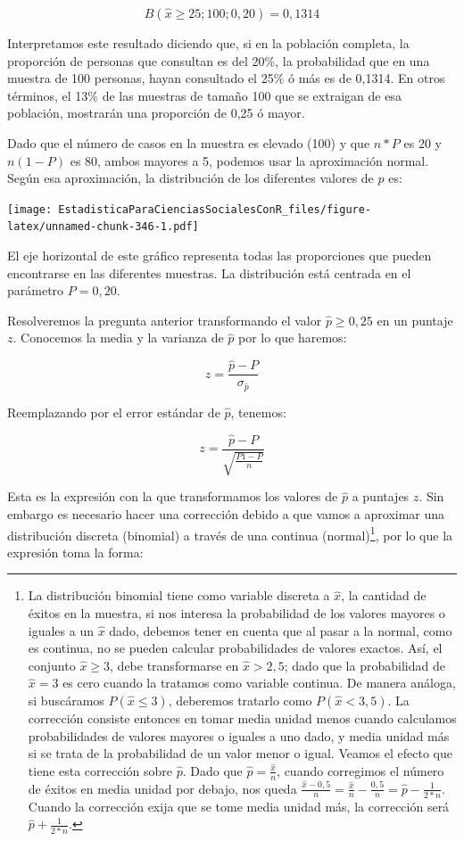 \documentclass[]{book}
\let\rmarkdownfootnote\footnote%
\def\footnote{\protect\rmarkdownfootnote}
\begin{document}
\[B( \widehat{x} \geq 25;100;0,20) = 0,1314\]

Interpretamos este resultado diciendo que, si en la población completa,
la proporción de personas que consultan es del 20\%, la probabilidad que
en una muestra de 100 personas, hayan consultado el 25\% ó más es de
0,1314. En otros términos, el 13\% de las muestras de tamaño 100 que se
extraigan de esa población, mostrarán una proporción de 0,25 ó mayor.

Dado que el número de casos en la muestra es elevado (100) y que \(n*P\)
es 20 y \(n(1-P)\) es 80, ambos mayores a 5, podemos usar la
aproximación normal. Según esa aproximación, la distribución de los
diferentes valores de \(\widehat{p}\) es:

\texttt{[image: EstadisticaParaCienciasSocialesConR\_files/figure-latex/unnamed-chunk-346-1.pdf]}

El eje horizontal de este gráfico representa todas las proporciones que
pueden encontrarse en las diferentes muestras. La distribución está
centrada en el parámetro \(P = 0,20\).

Resolveremos la pregunta anterior transformando el valor
\(\widehat{p} \geq 0,25\) en un puntaje \(z\). Conocemos la media y la
varianza de \(\widehat{p}\) por lo que haremos:

\[z = \frac{\widehat{p} - P}{\sigma_{\widehat{p}}}\]

Reemplazando por el error estándar de \(\widehat{p}\), tenemos:

\[z = \frac{\widehat{p} - P}{\sqrt{\frac{P1 - P}{n}}}\]

Esta es la expresión con la que transformamos los valores de
\(\widehat{p}\) a puntajes \(z\). Sin embargo es necesario hacer una
corrección debido a que vamos a aproximar una distribución discreta
(binomial) a través de una continua (normal)\footnote{La distribución binomial tiene como variable discreta a \(\widehat{x}\), la cantidad de éxitos en la muestra, si nos interesa la probabilidad de los valores mayores o iguales a un \(\widehat{x}\) dado, debemos tener en cuenta que al pasar a la normal, como es continua, no se pueden calcular probabilidades de valores exactos. Así, el conjunto \(\widehat{x} \geq 3\), debe transformarse en \(\widehat{x} > 2,5\); dado que la probabilidad de \(\widehat{x} = 3\) es cero cuando la tratamos como variable continua. De manera análoga, si buscáramos \(P(\widehat{x} \leq 3)\), deberemos tratarlo como \(P(\widehat{x} < 3,5)\). La corrección consiste entonces en tomar media unidad menos cuando calculamos probabilidades de valores mayores o iguales a uno dado, y media unidad más si se trata de la probabilidad de un valor menor o igual. Veamos el efecto que tiene esta corrección sobre \(\widehat{p}\). Dado que \(\widehat{p} = \frac{\widehat{x}}{n}\), cuando corregimos el número de éxitos en media unidad por debajo, nos queda \(\frac{\widehat{x} - 0,5}{n} = \frac{\widehat{x}}{n} - \frac{0,5}{n} = \widehat{p} - \frac{1}{2*n}\). Cuando la corrección exija que se tome media unidad más, la corrección será \(\widehat{p} + \frac{1}{2*n}\).}, por lo que la
expresión toma la forma:
\end{document}
